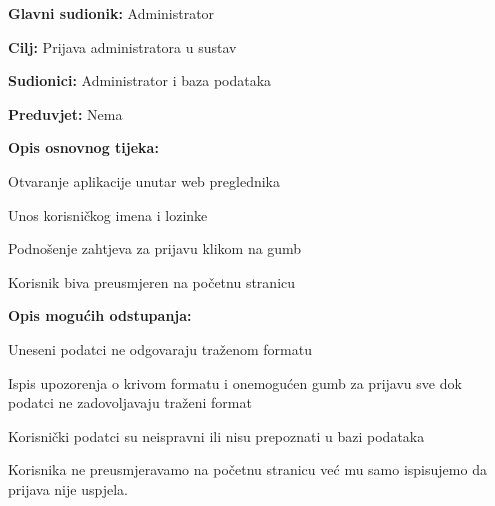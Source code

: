 					\noindent {}
					\begin{packed_item}
	
						\item \textbf{Glavni sudionik: } Administrator
						\item  \textbf{Cilj:} Prijava administratora u sustav
						\item  \textbf{Sudionici:} Administrator i baza podataka
						\item  \textbf{Preduvjet:} Nema
						\item  \textbf{Opis osnovnog tijeka:}
						
						\item[] \begin{packed_enum}
	
							\item Otvaranje aplikacije unutar web preglednika
							\item Unos korisničkog imena i lozinke
							\item Podnošenje zahtjeva za prijavu klikom na gumb
							\item Korisnik biva preusmjeren na početnu stranicu
						\end{packed_enum}
						
						\item  \textbf{Opis mogućih odstupanja:}
						
						\item[] \begin{packed_item}
	
							\item[2.a] Uneseni podatci ne odgovaraju traženom formatu
							\item[] \begin{packed_enum}
								
								\item Ispis upozorenja o krivom formatu i onemogućen gumb za prijavu sve dok podatci ne zadovoljavaju traženi format
								
							\end{packed_enum}

							\item[4.a] Korisnički podatci su neispravni ili nisu prepoznati u bazi podataka
							\item[] \begin{packed_enum}
								
								\item Korisnika ne preusmjeravamo na početnu stranicu već mu samo ispisujemo da prijava nije uspjela.
								
							\end{packed_enum}
						\end{packed_item}
					\end{packed_item}
					
